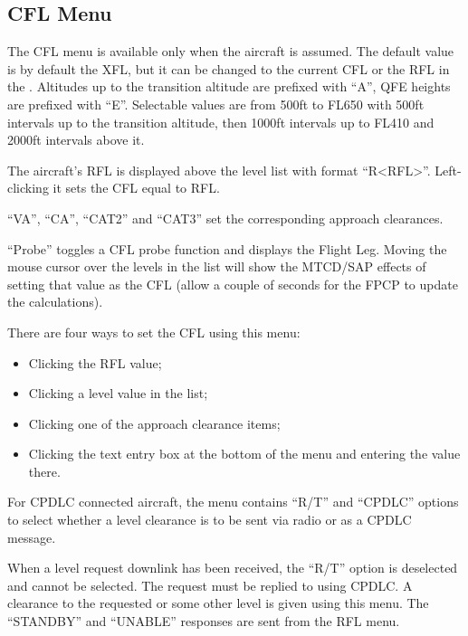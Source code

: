 \documentclass[a4paper,oneside,11pt]{memoir}
\begin{document}
\subsection{CFL Menu}
\label{menu:cfl}

The CFL menu is available only when the aircraft is assumed. The default value is by default the XFL, but it can be changed to the current CFL or the RFL in the . Altitudes up to the transition altitude are prefixed with “A”, QFE heights are prefixed with “E”. Selectable values are from 500ft to FL650 with 500ft intervals up to the transition altitude, then 1000ft intervals up to FL410 and 2000ft intervals above it. 

\bigskip

The aircraft’s RFL is displayed above the level list with format “R<RFL>”. Left-clicking it sets the CFL equal to RFL.

\bigskip

“VA”, “CA”, “CAT2” and “CAT3” set the corresponding approach clearances.

\bigskip

“Probe” toggles a CFL probe function and displays the Flight Leg. Moving the mouse cursor over the levels in the list will show the MTCD/SAP effects of setting that value as the CFL (allow a couple of seconds for the FPCP to update the calculations).

\bigskip

There are four ways to set the CFL using this menu:

\bigskip

\begin{itemize}
        \item Clicking the RFL value;
        \item Clicking a level value in the list;
        \item Clicking one of the approach clearance items;
        \item Clicking the text entry box at the bottom of the menu and entering the value there.
\end{itemize}


For CPDLC connected aircraft, the menu contains “R/T” and “CPDLC” options to select whether a level clearance is to be sent via radio or as a CPDLC message.

\bigskip

When a level request downlink has been received, the “R/T” option is deselected and cannot be selected. The request must be replied to using CPDLC. A clearance to the requested or some other level is given using this menu. The “STANDBY” and “UNABLE” responses are sent from the RFL menu.
\end{document}
